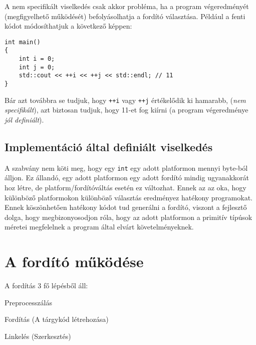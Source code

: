 \documentclass[a4paper,11.5pt,table]{article}
\begin{document}
  A nem specifikált viselkedés csak akkor probléma, ha a program végeredményét (megfigyelhető működését) befolyásolhatja a fordító választása. Például a fenti kódot módosíthatjuk a következő képpen:

	\begin{lstlisting}
int main()
{
	int i = 0;
	int j = 0;
	std::cout << ++i << ++j << std::endl; // 11
}
	\end{lstlisting}
	Bár azt továbbra se tudjuk, hogy \texttt{++i} vagy \texttt{++j} értékelődik ki hamarabb, (\textit{nem specifikált}), azt biztosan tudjuk, hogy 11-et fog kiírni (a program végeredménye \textit{jól definiált}).
	\subsection{Implementáció által definiált viselkedés}
	A szabvány nem köti meg, hogy egy \texttt{int} egy adott platformon mennyi byte-ból álljon. Ez állandó, egy adott platformon egy adott fordító mindig ugyanakkorát hoz létre, de platform/fordítóváltás esetén ez változhat. Ennek az az oka, hogy különböző platformokon különböző választás eredményez hatékony programokat. Ennek köszönhetően hatékony kódot tud generálni a fordító, viszont a fejlesztő dolga, hogy megbizonyosodjon róla, hogy az adott platformon a primitív típúsok méretei megfelelnek a program által elvárt követelményeknek.
	
	\section{A fordító működése}
	A fordítás 3 fő lépésből áll:
	\begin{compactenum}
		\item Preprocesszálás
		\item Fordítás (A tárgykód létrehozása)
		\item Linkelés (Szerkesztés)
	\end{compactenum}
	
\end{document}
